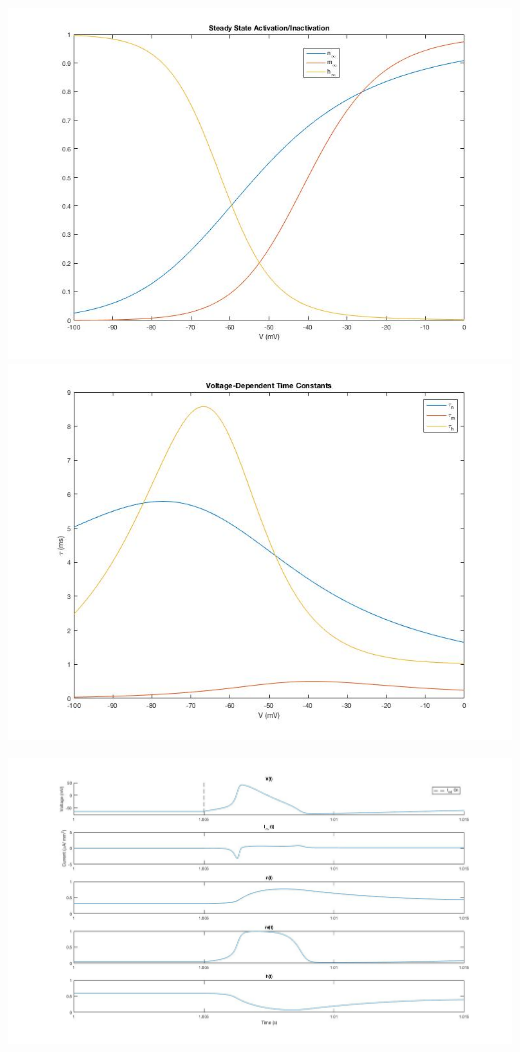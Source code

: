 \documentclass{121Temp}
\begin{document}
\hwproblem
\includegraphics[scale=.55]{510a.jpg}
\hwproblem
\includegraphics[scale=.55]{510b.jpg}

\hwproblem

\includegraphics[scale=.45]{511.jpg}
\end{document}
